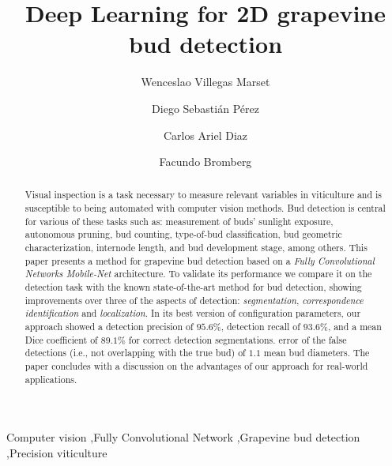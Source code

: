 \documentclass[a4paper,authoryear,review]{elsarticle}
\begin{document}
	
	\begin{frontmatter}
		
		\title{Deep Learning for 2D grapevine bud detection}
		
		\author[utn]{Wenceslao Villegas Marset}
		
		\author[utn]{Diego Sebastián Pérez}
		
		\author[utn]{Carlos Ariel Diaz}
		
		\author[utn,conicet]{Facundo Bromberg}
		
		\address[utn]{Universidad Tecnológica Nacional, Facultad Regional Mendoza, Grupo de Inteligencia Artificial DHARMa, Dpto. de Sistemas de la Información. Rodríguez 273, CP 5500, Mendoza, Argentina.}
		
		\address[conicet]{Consejo Nacional de Investigaciones Científicas y Técnicas (CONICET).}
		
		
		\begin{abstract}
			Visual inspection is a task necessary to measure relevant variables in viticulture and is susceptible to being automated with computer vision methods. Bud detection is central for various of these tasks such as: measurement of buds’ sunlight exposure, autonomous pruning, bud counting, type-of-bud classification, bud geometric characterization, internode length, and bud development stage, among others. This paper presents a method for grapevine bud detection based on a \emph{Fully Convolutional Networks Mobile-Net} architecture. To validate its performance we compare it on the detection task with the known state-of-the-art method for bud detection, showing improvements over three of the aspects of detection: \emph{segmentation}, \emph{correspondence identification} and \emph{localization}. In its best version of configuration parameters, our approach showed a detection precision of $95.6\%$, detection recall of $93.6\%$, and a mean Dice coefficient of $89.1\%$ for correct detection segmentations.  error of the false detections (i.e., not overlapping with the true bud) of $1.1$ mean bud diameters. The paper concludes with a discussion on the  advantages of our approach for real-world applications.
		\end{abstract}
		
		\begin{keyword}
			Computer vision \sep Fully Convolutional Network \sep Grapevine bud detection \sep Precision viticulture
		\end{keyword}
		
	\end{frontmatter}
	
\end{document}

